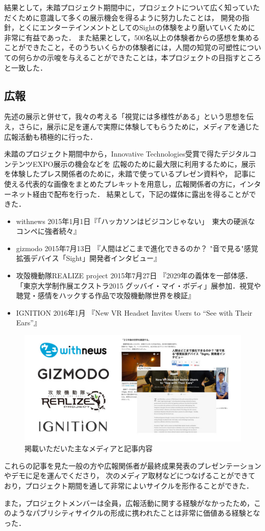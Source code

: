 結果として，未踏プロジェクト期間中に，プロジェクトについて広く知っていただくために意識して多くの展示機会を得るように努力したことは，
開発の指針，とくにエンターテインメントとしてのSightの体験をより磨いていくために非常に有益であった．
また結果として，500名以上の体験者からの感想を集めることができたこと，そのうちいくらかの体験者には，人間の知覚の可塑性についての何らかの示唆を与えることができたことは，本プロジェクトの目指すところと一致した．

\subsection{広報}
先述の展示と併せて，我々の考える「視覚には多様性がある」という思想を伝え，さらに，展示に足を運んで実際に体験してもらうために，メディアを通じた広報活動も積極的に行った．

未踏のプロジェクト期間中から，Innovative Technologies受賞で得たデジタルコンテンツEXPO展示の機会などを
広報のために最大限に利用するために，展示を体験したプレス関係者のために，未踏で使っているプレゼン資料や，
記事に使える代表的な画像をまとめたプレキットを用意し，広報関係者の方に，インターネット経由で配布を行った．
結果として，下記の媒体に露出を得ることができた．

\begin{itemize}
 \item withnews 2015年1月1日『「ハッカソンはビジコンじゃない」　東大の硬派なコンペに強者続々』
 \item gizmodo 2015年7月13日 『人間はどこまで進化できるのか？ "音で見る"感覚拡張デバイス「Sight」開発者インタビュー』
 \item 攻殻機動隊REALIZE project 2015年7月27日 『2029年の義体を一部体感．「東京大学制作展エクストラ2015 グッバイ・マイ・ボディ」展参加．視覚や聴覚・感情をハックする作品で攻殻機動隊世界を検証』
 \item IGNITION 2016年1月 『New VR Headset Invites Users to “See with Their Ears”』
\end{itemize}

\begin{figure}[h]
\begin{center}
\includegraphics[width=120mm, bb=0 0 674 330]{images/publicity/publicity.png}
\caption{掲載いただいた主なメディアと記事内容}
\end{center}
\end{figure}


これらの記事を見た一般の方や広報関係者が最終成果発表のプレゼンテーションやデモに足を運んでくださり，
次のメディア取材などにつなげることができており，プロジェクト期間を通して非常によいサイクルを形作ることができた．

また，プロジェクトメンバーは全員，広報活動に関する経験がなかったため，このようなパブリシティサイクルの形成に携われたことは非常に価値ある経験となった．








